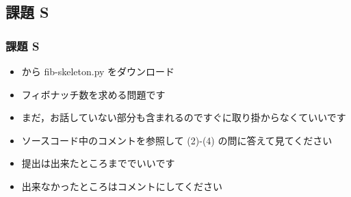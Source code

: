 %
%
\subsection{課題 S}
\begin{frame}[containsverbatim, shrink, label=quizS]
\frametitle{課題 S}
  \begin{itemize}
\item \href{https://sites.google.com/presystems.xyz/elementaryCS/}{} から fib-skeleton.py をダウンロード
\item フィボナッチ数を求める問題です
\item まだ，お話していない部分も含まれるのですぐに取り掛からなくていいです
\item ソースコード中のコメントを参照して (2)-(4) の問に答えて見てください
\item 提出は出来たところまででいいです
\item 出来なかったところはコメントにしてください
  \end{itemize}
\end{frame}
